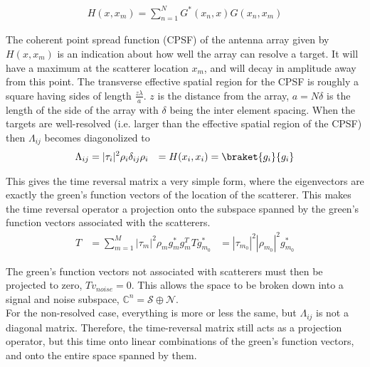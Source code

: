 \documentclass[14pt]{article}
\begin{document}
	\begin{align}
		H(x,x_m) = \sum_{n=1}^N G^*(x_n,x)G(x_n,x_m)
	\end{align}

	The coherent point spread function (CPSF) of the antenna array given by $H(x,x_m)$
	is an indication about how well the array can resolve a target.  
	It will have a maximum at the scatterer location $x_m$, and will decay in
	amplitude away from this point.  The transverse effective spatial region for 
	the CPSF is roughly a square having sides of length $\frac{z\lambda}{a}$.  
	$z$ is the distance from the array, $a = N \delta$ is the length of the 
	side of the array with $\delta$ being the inter element spacing.  When the
	targets are well-resolved (i.e. larger than the effective spatial region of the
	CPSF) then $\Lambda_{ij}$ becomes diagonolized to
	\begin{align}
		\Lambda_{ij} &= |\tau_i|^2\rho_i \delta_{ij}
		\rho_i &= H(x_i,x_i) = \braket{g_i}{g_i}
	\end{align}
	
	This gives the time reversal matrix a very simple form, where the eigenvectors
	are exactly the green's function vectors of the location of the scatterer.  
	This makes the time reversal operator a projection onto the subspace spanned
	by the green's function vectors associated with the scatterers.
	\begin{align}
		T &= \sum_{m=1}^M |\tau_m|^2 \rho_m  g_m^*g_m^T
		Tg_{m_0}^* &= |\tau_{m_0}|^2|\rho_{m_0}|^2 g_{m_0}^*
	\end{align}
		
	The green's function vectors not associated with scatterers must then be 
	projected to zero, $Tv_{noise} = 0$.  This allows the space to be broken down
	into a signal and noise subspace, $\mathbb{C}^n = \mathcal{S} \oplus  \mathcal{N}$.~\\

	For the non-resolved case, everything is more or less the same, but
	$\Lambda_{ij}$ is not a diagonal matrix.  Therefore, the time-reversal matrix
	still acts as a projection operator, but this time onto linear combinations
	of the green's function vectors, and onto the entire space spanned by them.
\end{document}
